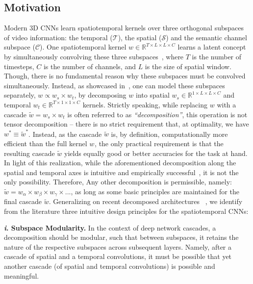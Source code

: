 \documentclass[10pt,twocolumn,letterpaper]{article}
\newcommand{\partitle}[1]{\noindent\textbf{#1}}
\begin{document}
\subsection{Motivation}
\label{subsec:motivation}
Modern 3D CNNs learn spatiotemporal kernels over three orthogonal subspaces of video information: the temporal ($\mathcal{T}$), the spatial ($\mathcal{S}$) and the semantic channel subspace ($\mathcal{C}$).
One spatiotemporal kernel $w \in \mathbb{R}^{T \times L \times L \times C}$ learns a latent concept by simultaneously convolving these three subspaces~\cite{tran2015learning, carreira2017quo}, where $T$ is the number of timesteps, $C$ is the number of channels, and $L$ is the size of spatial window.
Though, there is no fundamental reason why these subspaces must be convolved simultaneously.
Instead, as showcased in~\cite{xie2017rethinking}, one can model these subspaces separately, $w \propto w_{s} \times w_{t}$, by decomposing $w$ into spatial $w_{s} \in \mathbb{R}^{1 \times L \times L \times C}$ and temporal $w_{t} \in \mathbb{R}^{T \times 1 \times 1 \times C}$ kernels.
Strictly speaking, while replacing $w$ with a cascade $\tilde{w}=w_s \times w_t$ is often referred to as \emph{``decomposition''}, this operation is not tensor decomposition -- there is no strict requirement that, at optimality, we have $w^* \equiv \tilde{w}^*$.
Instead, as the cascade $\tilde{w}$ is, by definition, computationally more efficient than the full kernel $w^{}$, the only practical requirement is that the resulting cascade $\tilde{w}$ yields equally good or better accuracies for the task at hand.
In light of this realization, while the aforementioned decomposition along the spatial and temporal axes is intuitive and empirically successful~\cite{xie2017rethinking}, it is not the only possibility.
Therefore, Any other decomposition is permissible, namely:
$\tilde{w}= w_\alpha \times w_\beta \times w_\gamma \times ...$,
as long as some basic principles are maintained for the final cascade $\tilde{w}$.
Generalizing on recent decomposed architectures ~\cite{tran2018closer,chollet2016xception}, we identify from the literature three intuitive design principles for the spatiotemporal CNNs:

\partitle{\textit{i}. Subspace Modularity.}
In the context of deep network cascades, a decomposition should be modular, such that between subspaces, it retains the nature of the respective subspaces across subsequent layers.
Namely, after a cascade of spatial and a temporal convolutions, it must be possible that yet another cascade (of spatial and temporal convolutions) is possible and meaningful.
\end{document}
